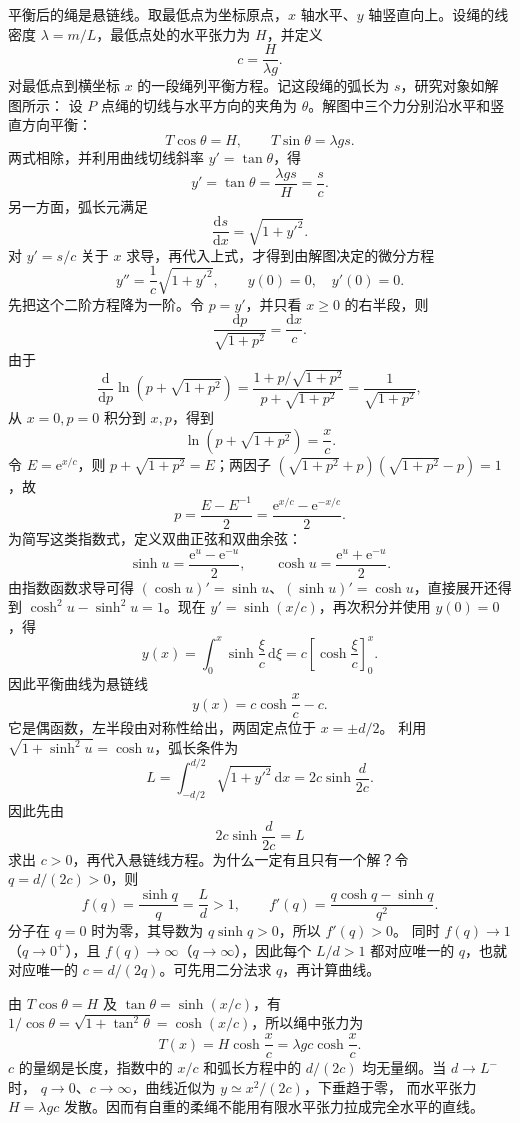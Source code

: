 \begin{xesolution}
平衡后的绳是悬链线。取最低点为坐标原点，$x$ 轴水平、$y$ 轴竖直向上。设绳的线密度
$\lambda=m/L$，最低点处的水平张力为 $H$，并定义
\[
  c=\frac{H}{\lambda g}.
\]
对最低点到横坐标 $x$ 的一段绳列平衡方程。记这段绳的弧长为 $s$，研究对象如解图所示：
\soldiagOneTwentySeven
设 $P$ 点绳的切线与水平方向的夹角为 $\theta$。解图中三个力分别沿水平和竖直方向平衡：
\[
  T\cos\theta=H,
  \qquad
  T\sin\theta=\lambda gs.
\]
两式相除，并利用曲线切线斜率 $y'=\tan\theta$，得
\[
  y'=\tan\theta=\frac{\lambda gs}{H}=\frac{s}{c}.
\]
另一方面，弧长元满足
\[
  \frac{\mathrm ds}{\mathrm dx}=\sqrt{1+y'^2}.
\]
对 $y'=s/c$ 关于 $x$ 求导，再代入上式，才得到由解图决定的微分方程
\[
  y''=\frac{1}{c}\sqrt{1+y'^2},
  \qquad y(0)=0,\quad y'(0)=0.
\]
先把这个二阶方程降为一阶。令 $p=y'$，并只看 $x\ge0$ 的右半段，则
\[
 \frac{\mathrm dp}{\sqrt{1+p^2}}=\frac{\mathrm dx}{c}.
\]
由于
\[
 \frac{\mathrm d}{\mathrm dp}\ln\!\left(p+\sqrt{1+p^2}\right)
 =\frac{1+p/\sqrt{1+p^2}}{p+\sqrt{1+p^2}}
 =\frac1{\sqrt{1+p^2}},
\]
从 $x=0,p=0$ 积分到 $x,p$，得到
\[
 \ln\!\left(p+\sqrt{1+p^2}\right)=\frac xc.
\]
令 $E=\mathrm e^{x/c}$，则 $p+\sqrt{1+p^2}=E$；两因子
$(\sqrt{1+p^2}+p)(\sqrt{1+p^2}-p)=1$，故
\[
 p=\frac{E-E^{-1}}2=\frac{\mathrm e^{x/c}-\mathrm e^{-x/c}}2.
\]
为简写这类指数式，定义双曲正弦和双曲余弦：
\[
 \sinh u=\frac{\mathrm e^u-\mathrm e^{-u}}2,\qquad
 \cosh u=\frac{\mathrm e^u+\mathrm e^{-u}}2.
\]
由指数函数求导可得 $(\cosh u)'=\sinh u$、$(\sinh u)'=\cosh u$，直接展开还得到
$\cosh^2u-\sinh^2u=1$。现在 $y'=\sinh(x/c)$，再次积分并使用 $y(0)=0$，得
\[
 y(x)=\int_0^x\sinh\frac{\xi}{c}\,\mathrm d\xi
 =c\left[\cosh\frac{\xi}{c}\right]_0^x.
\]
因此平衡曲线为悬链线
\[
  \boxed{y(x)=c\cosh\frac{x}{c}-c}.
\]
它是偶函数，左半段由对称性给出，两固定点位于 $x=\pm d/2$。
利用 $\sqrt{1+\sinh^2u}=\cosh u$，弧长条件为
\[
  L=\int_{-d/2}^{d/2}\sqrt{1+y'^2}\,\mathrm dx
  =2c\sinh\frac{d}{2c}.
\]
因此先由
\[
  \boxed{2c\sinh\frac{d}{2c}=L}
\]
求出 $c>0$，再代入悬链线方程。为什么一定有且只有一个解？令 $q=d/(2c)>0$，则
\[
 f(q)=\frac{\sinh q}{q}=\frac Ld>1,\qquad
 f'(q)=\frac{q\cosh q-\sinh q}{q^2}.
\]
分子在 $q=0$ 时为零，其导数为 $q\sinh q>0$，所以 $f'(q)>0$。
同时 $f(q)\to1$（$q\to0^+$），且 $f(q)\to\infty$（$q\to\infty$），因此每个 $L/d>1$
都对应唯一的 $q$，也就对应唯一的 $c=d/(2q)$。可先用二分法求 $q$，再计算曲线。

由 $T\cos\theta=H$ 及 $\tan\theta=\sinh(x/c)$，有
$1/\cos\theta=\sqrt{1+\tan^2\theta}=\cosh(x/c)$，所以绳中张力为
\[
  T(x)=H\cosh\frac{x}{c}=\lambda gc\cosh\frac{x}{c}.
\]
$c$ 的量纲是长度，指数中的 $x/c$ 和弧长方程中的 $d/(2c)$ 均无量纲。当 $d\to L^-$ 时，
$q\to0$、$c\to\infty$，曲线近似为 $y\simeq x^2/(2c)$，下垂趋于零，
而水平张力 $H=\lambda gc$ 发散。因而有自重的柔绳不能用有限水平张力拉成完全水平的直线。
\end{xesolution}

